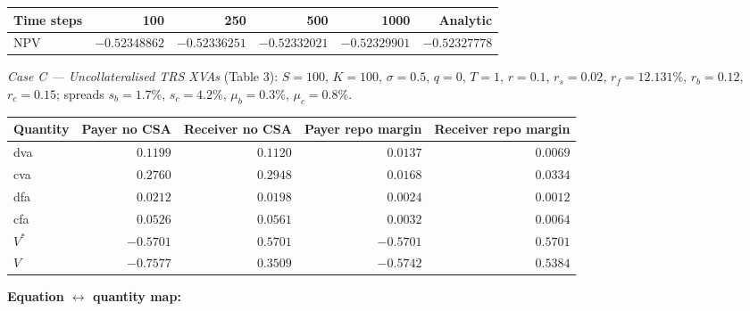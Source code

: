 \documentclass[11pt,a4paper]{article}
\begin{document}
\begin{validation}
\smallskip
\begin{tabular}{@{}lrrrrr@{}}
\toprule
Time steps                        & 100              & 250              & 500              & 1000             & Analytic \\
\midrule
NPV                               & $-0.52348862$    & $-0.52336251$    & $-0.52332021$    & $-0.52329901$    & $-0.52327778$ \\
\bottomrule
\end{tabular}
\smallskip

\textit{Case C --- Uncollateralised TRS XVAs} (Table 3):
$S = 100$, $K = 100$, $\sigma = 0.5$, $q = 0$, $T = 1$, $r = 0.1$,
$r_s = 0.02$, $r_f = 12.131\%$, $r_b = 0.12$, $r_c = 0.15$;
spreads $s_b = 1.7\%$, $s_c = 4.2\%$, $\mu_b = 0.3\%$, $\mu_c = 0.8\%$.

\smallskip
\begin{tabular}{@{}lrrrr@{}}
\toprule
Quantity                          & Payer no CSA    & Receiver no CSA & Payer repo margin & Receiver repo margin \\
\midrule
dva                               & $0.1199$         & $0.1120$         & $0.0137$           & $0.0069$ \\
cva                               & $0.2760$         & $0.2948$         & $0.0168$           & $0.0334$ \\
dfa                               & $0.0212$         & $0.0198$         & $0.0024$           & $0.0012$ \\
cfa                               & $0.0526$         & $0.0561$         & $0.0032$           & $0.0064$ \\
$V^*$                             & $-0.5701$        & $0.5701$         & $-0.5701$          & $0.5701$ \\
$V$                               & $-0.7577$        & $0.3509$         & $-0.5742$          & $0.5384$ \\
\bottomrule
\end{tabular}
\smallskip

\textbf{Equation $\leftrightarrow$ quantity map:}


\end{validation}
\end{document}
